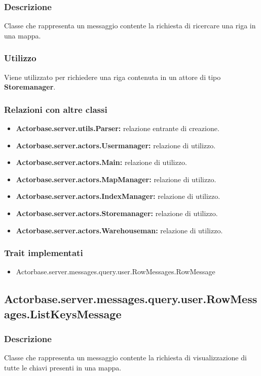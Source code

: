 \documentclass[a4paper]{article}
\begin{document}
			\subsubsection{Descrizione}
				Classe che rappresenta un messaggio contente la richiesta di ricercare una riga in una mappa.
				
			\subsubsection{Utilizzo}
				Viene utilizzato per richiedere una riga contenuta in un attore di tipo \textbf{Storemanager}.
				
			\subsubsection{Relazioni con altre classi}
				\begin{itemize}
					\item \textbf{Actorbase.server.utils.Parser:} relazione entrante di creazione.
					\item \textbf{Actorbase.server.actors.Usermanager:} relazione di utilizzo.
					\item \textbf{Actorbase.server.actors.Main:} relazione di utilizzo.
					\item \textbf{Actorbase.server.actors.MapManager:} relazione di utilizzo.
					\item \textbf{Actorbase.server.actors.IndexManager:} relazione di utilizzo.
					\item \textbf{Actorbase.server.actors.Storemanager:} relazione di utilizzo.
					\item \textbf{Actorbase.server.actors.Warehouseman:} relazione di utilizzo.
				\end{itemize}
			\subsubsection{Trait implementati}
				\begin{itemize}
					\item Actorbase.server.messages.query.user.RowMessages.RowMessage
				\end{itemize}
				
		\subsection{Actorbase.server.messages.query.user.RowMessages.ListKeysMessage}
			\subsubsection{Descrizione}
				Classe che rappresenta un messaggio contente la richiesta di visualizzazione di tutte le chiavi presenti in una mappa.
				
\end{document}
